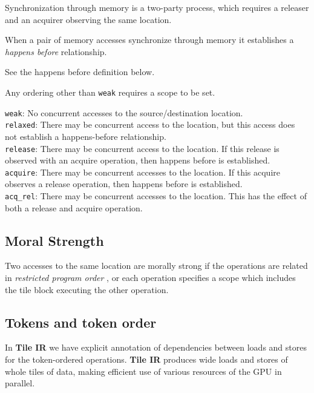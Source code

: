 \documentclass{article}
\begin{document}
Synchronization through memory is a two-party process, which requires a releaser and an acquirer observing the same location.

When a pair of memory accesses synchronize through memory it establishes a \textit{happens before} relationship.

See the happens before definition below.


Any ordering other than \texttt{weak} requires a scope to be set.


\texttt{weak}: No concurrent accesses to the source/destination location. \\ %
\texttt{relaxed}: There may be concurrent access to the location, but this access does not establish a happens-before relationship. \\ %
\texttt{release}: There may be concurrent access to the location. If this release is observed with an acquire operation, then happens before is established. \\ %
\texttt{acquire}: There may be concurrent accesses to the location. If this acquire observes a release operation, then happens before is established. \\ %
\texttt{acq\_rel}: There may be concurrent accesses to the location. This has the effect of both a release and acquire operation.  %


\subsection{Moral Strength}

Two accesses to the same location are morally strong if the operations are related in \textit{restricted program order} , or each operation specifies a scope which includes the tile block executing the other operation.



\subsection{Tokens and token order}

In \textbf{Tile IR} we have explicit annotation of dependencies between loads and stores for the token-ordered operations. \textbf{Tile IR} produces wide loads and stores of whole tiles of data, making efficient use of various resources of the GPU in parallel.
\end{document}
